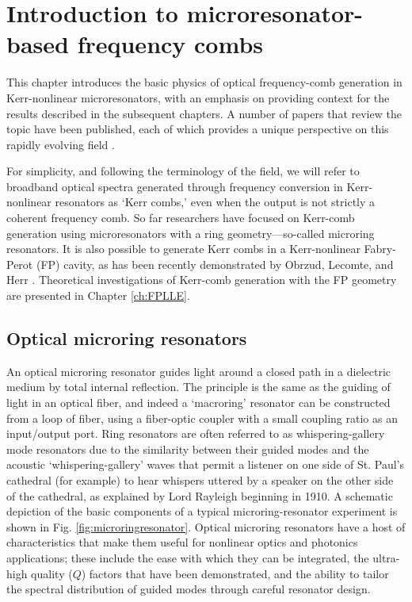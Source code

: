 \chapter{Introduction to microresonator-based frequency combs}
 \label{ch:microresonators}
 
 This chapter introduces the basic physics of optical frequency-comb generation in Kerr-nonlinear microresonators, with an emphasis on providing context for the results described in the subsequent chapters. A number of papers that review the topic have been published, each of which provides a unique perspective on this rapidly evolving field \cite{Kippenberg2011,Savchenkov2016,Chembo2016a,Pasquazi2018}.
 
 For simplicity, and following the terminology of the field, we will refer to broadband optical spectra generated through frequency conversion in Kerr-nonlinear resonators as `Kerr combs,' even when the output is not strictly a coherent frequency comb. So far researchers have focused on Kerr-comb generation using microresonators with a ring geometry---so-called microring resonators. It is also possible to generate Kerr combs in a Kerr-nonlinear Fabry-Perot (FP) cavity, as has been recently demonstrated by Obrzud, Lecomte, and Herr \cite{Obrzud2017}. Theoretical investigations of Kerr-comb generation with the FP geometry are presented in Chapter \ref{ch:FPLLE}.
 

 
 \section{Optical microring resonators} \label{sec:OMRR}
An optical microring resonator guides light around a closed path in a dielectric medium by total internal reflection. The principle is the same as the guiding of light in an optical fiber, and indeed a `macroring' resonator can be constructed from a loop of fiber, using a fiber-optic coupler with a small coupling ratio as an input/output port. Ring resonators are often referred to as whispering-gallery mode resonators due to the similarity between their guided modes and the acoustic `whispering-gallery' waves that permit a listener on one side of St. Paul's cathedral (for example) to hear whispers uttered by a speaker on the other side of the cathedral, as explained by Lord Rayleigh beginning in 1910. A schematic depiction of the basic components of a typical microring-resonator experiment is shown in Fig. \ref{fig:microringresonator}. Optical microring resonators have a host of characteristics that make them useful for nonlinear optics and photonics applications; these include the ease with which they can be integrated, the ultra-high quality ($Q$) factors that have been demonstrated, and the ability to tailor the spectral distribution of guided modes through careful resonator design.  


